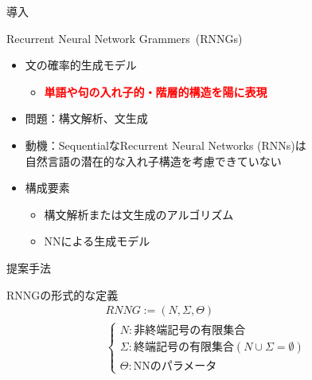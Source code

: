 \documentclass[aspectratio=43,unicode,10pt]{beamer}
\title{\thetitle}
\author[Chris Dyer et al.]
       {Chris Dyer, Adhiguna Kuncoro, Miguel Ballesteros, \\ Noah A. Smith}
\newcommand{\fire}[1]{\textcolor{red}{\textbf{#1}}}
\newcommand{\term}{終端記号}
\newcommand{\nt}{非終端記号}
\newcommand{\thetitle}{Recurrent Neural Network Grammers}
\begin{document}
\begin{frame}
  \titlepage
\end{frame}

\begin{frame}{導入}
  \begin{block}{\thetitle~(RNNGs)}
    \begin{itemize}
      \item 文の確率的生成モデル
        \begin{itemize}
          \item \fire{単語や句の入れ子的・階層的構造を陽に表現}
        \end{itemize}
      \item 問題：構文解析、文生成
      \item 動機：SequentialなRecurrent Neural Networks (RNNs)は \\
            自然言語の潜在的な入れ子構造を考慮できていない
      \item 構成要素
        \begin{itemize}
          \item 構文解析または文生成のアルゴリズム
          \item NNによる生成モデル
        \end{itemize}
    \end{itemize}
  \end{block}
\end{frame}

\begin{frame}{提案手法}
  \begin{block}{RNNGの形式的な定義}
    \begin{gather*}
      RNNG := (N, \Sigma, \Theta) \\
      \begin{cases}
        N: \text{\nt の有限集合} \\
        \Sigma: \text{\term の有限集合} (N \cup \Sigma = \emptyset) \\
        \Theta: \text{NNのパラメータ}
      \end{cases}
    \end{gather*}
  \end{block}
\end{frame}
\end{document}
